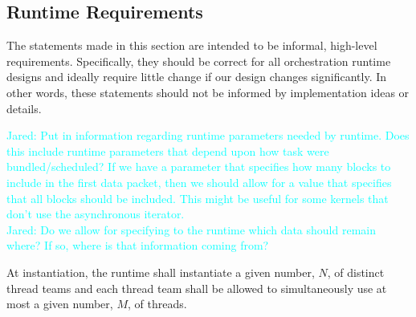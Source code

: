 \documentclass{article}
\newcommand{\Jared}[1]          {\textcolor{cyan}{Jared: #1}}
\begin{document}
%
%
%
%

\subsection{Runtime Requirements}
The statements made in this section are intended to be informal, high-level
requirements.  Specifically, they should be correct for all orchestration
runtime designs and ideally require little change if our design changes
significantly.  In other words, these statements should not be informed by
implementation ideas or details.

\Jared{Put in information regarding runtime parameters needed by
runtime.  Does this include runtime parameters that depend upon how task were
bundled/scheduled?  If we have a parameter that specifies how many blocks to
include in the first data packet, then we should allow for a value that
specifies that all blocks should be included.  This might be useful for some
kernels that don't use the asynchronous iterator.}\\

\Jared{Do we allow for specifying to the runtime which data should
remain where?  If so, where is that information coming from?}

\begin{req}
At instantiation, the runtime shall instantiate a given number, $N$, of distinct
thread teams and each thread team shall be allowed to simultaneously use
at most a given number, $M$, of threads.
\end{req}
\end{document}
